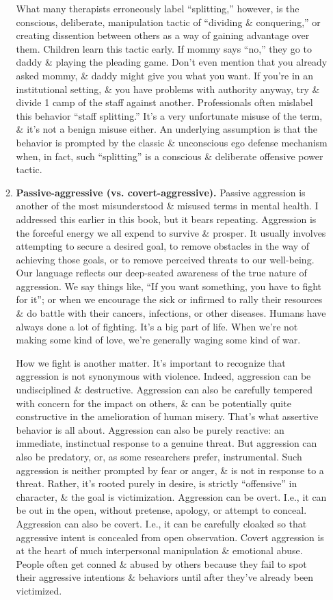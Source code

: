 \documentclass{article}
\numberwithin{equation}{section}
\begin{document}
\begin{itemize}
\begin{enumerate}
		What many therapists erroneously label ``splitting,'' however, is the conscious, deliberate, manipulation tactic of ``dividing \& conquering,'' or creating dissention between others as a way of gaining advantage over them. Children learn this tactic early. If mommy says ``no,'' they go to daddy \& playing the pleading game. Don't even mention that you already asked mommy, \& daddy might give you what you want. If you're in an institutional setting, \& you have problems with authority anyway, try \& divide 1 camp of the staff against another. Professionals often mislabel this behavior ``staff splitting.'' It's a very unfortunate misuse of the term, \& it's not a benign misuse either. An underlying assumption is that the behavior is prompted by the classic \& unconscious ego defense mechanism when, in fact, such ``splitting'' is a conscious \& deliberate offensive power tactic.
		\item \textbf{Passive-aggressive (vs. covert-aggressive).} Passive aggression is another of the most misunderstood \& misused terms in mental health. I addressed this earlier in this book, but it bears repeating. Aggression is the forceful energy we all expend to survive \& prosper. It usually involves attempting to secure a desired goal, to remove obstacles in the way of achieving those goals, or to remove perceived threats to our well-being. Our language reflects our deep-seated awareness of the true nature of aggression. We say things like, ``If you want something, you have to fight for it''; or when we encourage the sick or infirmed to rally their resources \& do battle with their cancers, infections, or other diseases. Humans have always done a lot of fighting. It's a big part of life. When we're not making some kind of love, we're generally waging some kind of war.
		
		How we fight is another matter. It's important to recognize that aggression is not synonymous with violence. Indeed, aggression can be undisciplined \& destructive. Aggression can also be carefully tempered with concern for the impact on others, \& can be potentially quite constructive in the amelioration of human misery. That's what assertive behavior is all about. Aggression can also be purely reactive: an immediate, instinctual response to a genuine threat. But aggression can also be predatory, or, as some researchers prefer, instrumental. Such aggression is neither prompted by fear or anger, \& is not in response to a threat. Rather, it's rooted purely in desire, is strictly ``offensive'' in character, \& the goal is victimization. Aggression can be overt. I.e., it can be out in the open, without pretense, apology, or attempt to conceal. Aggression can also be covert. I.e., it can be carefully cloaked so that aggressive intent is concealed from open observation. Covert aggression is at the heart of much interpersonal manipulation \& emotional abuse. People often get conned \& abused by others because they fail to spot their aggressive intentions \& behaviors until after they've already been victimized.
		

\end{enumerate}
\end{itemize}
\end{document}

